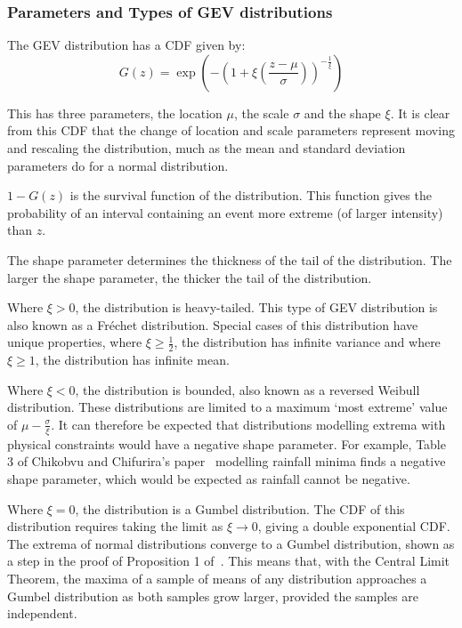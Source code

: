 \subsubsection{Parameters and Types of GEV distributions}

The GEV distribution has a CDF given by:
\begin{equation}\label{eq:gevcdf}
    G(z) = \exp \left( - \left( 1 + \xi \left( \frac{z-\mu}{\sigma} \right)  \right)^{-\frac{1}{\xi}} \right)
\end{equation}

This has three parameters, the location $\mu$, the scale $\sigma$ and the shape $\xi$.
It is clear from this CDF that the change of location and scale parameters represent moving and rescaling the distribution,
    much as the mean and standard deviation parameters do for a normal distribution.

$1-G(z)$ is the survival function of the distribution.
This function gives the probability of an interval containing an event more extreme (of larger intensity) than $z$.

The shape parameter determines the thickness of the tail of the distribution.
The larger the shape parameter, the thicker the tail of the distribution.


Where $\xi > 0$,
    the distribution is heavy-tailed.
This type of GEV distribution is also known as a Fr\'{e}chet distribution.
Special cases of this distribution have unique properties,
    where $\xi \geq \frac{1}{2}$, the distribution has infinite variance and
    where $\xi \geq 1$, the distribution has infinite mean.

Where $\xi < 0$, the distribution is bounded,
    also known as a reversed Weibull distribution.
These distributions are limited to a maximum `most extreme' value of $\mu - \frac{\sigma}{\xi}$.
It can therefore be expected that distributions modelling extrema with physical constraints would have a negative shape parameter.
For example, Table 3 of Chikobvu and Chifurira's paper~\cite{Chikobvu_2015} modelling rainfall minima finds a negative shape parameter,
    which would be expected as rainfall cannot be negative.

Where $\xi = 0$,
    the distribution is a Gumbel distribution.
The CDF of this distribution requires taking the limit as $\xi \rightarrow 0$,
    giving a double exponential CDF\@.
The extrema of normal distributions converge to a Gumbel distribution,
    shown as a step in the proof of Proposition 1 of~\cite{Bailey_2014}.
This means that, with the Central Limit Theorem,
    the maxima of a sample of means of any distribution approaches a Gumbel distribution as both samples grow larger,
    provided the samples are independent.

